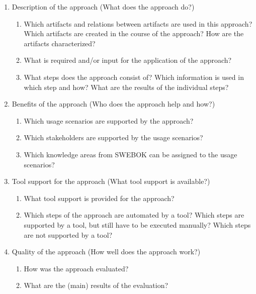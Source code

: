 \begin{enumerate}
	\item Description of the approach (What does the approach do?)
	\begin{enumerate}
		\item Which artifacts and relations between artifacts are used in this approach? Which artifacts are created in the course of the approach? How are the artifacts characterized?
		\item What is required and/or input for the application of the approach?
		\item What steps does the approach consist of? Which information is used in which step and how? What are the results of the individual steps?
	\end{enumerate}
	\item Benefits of the approach (Who does the approach help and how?)
	\begin{enumerate}
		\item Which usage scenarios are supported by the approach?
		\item Which stakeholders are supported by the usage scenarios?
		\item Which knowledge areas from SWEBOK can be assigned to the usage scenarios?
	\end{enumerate}
	\item Tool support for the approach (What tool support is available?)
	\begin{enumerate}
		\item What tool support is provided for the approach?
		\item Which steps of the approach are automated by a tool? Which steps are supported by a tool, but still have to be executed manually? Which steps are not supported by a tool?
	\end{enumerate}
	\item Quality of the approach (How well does the approach work?)
	\begin{enumerate}
		\item How was the approach evaluated?
		\item What are the (main) results of the evaluation?
	\end{enumerate}
\end{enumerate}

